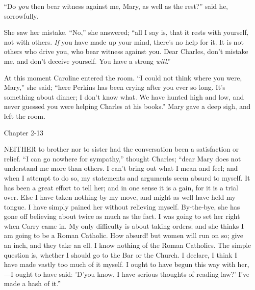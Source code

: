 ``Do \emph{you} then bear witness against me, Mary, as well as
the rest?'' said he, sorrowfully.

She saw her mistake. ``No,'' she answered; ``all I say
is, that it rests with yourself, not with others. \emph{If} you have
made up your mind, there's no help for it. It is not others who drive
you, who bear witness against you. Dear Charles, don't mistake
me, and don't deceive yourself. You have a strong \emph{will}.''

At this moment Caroline entered the room. ``I could not think
where you were, Mary,'' she said; ``here Perkins has been
crying after you ever so long. It's something about dinner; I don't
know what. We have hunted high and low, and never guessed you were
helping Charles at his books.'' Mary gave a deep sigh, and left
the room.

Chapter 2-13


NEITHER to brother nor to sister had
the conversation been a satisfaction or relief. ``I can go nowhere
for sympathy,'' thought Charles; ``dear Mary does not
understand me more than others. I can't bring out what I mean and
feel; and when I attempt to do so, my statements and arguments seem
absurd to myself. It has been a great effort to tell her; and in one
sense it is a gain, for it is a trial over. Else I have taken nothing
by my move, and might as well have held my tongue. I have simply
pained her without relieving myself. By-the-bye, she has gone off
believing about twice as much as the fact. I was going to set her
right when Carry came in. My only difficulty is about taking orders;
and she thinks I am going to be a Roman Catholic. How absurd! but
women will run on so; give an inch, and they take an ell. I know
nothing of the Roman Catholics. The simple question is, whether I
should go to the Bar or the Church. I declare, I think I have made
vastly too much of it myself. I ought to have begun this way with her,—I
ought to have said: 'D'you know, I have serious thoughts of reading
law?' I've made a hash of it.''

